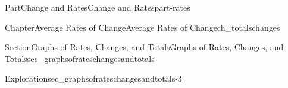 \documentclass[oneside,10pt,]{tufte-book}
\numberwithin{equation}{chapter}
\def \tikzhistogram (#1,#2){\draw[fill=blue,opacity=0.3] ({#1+((\xtwo-\xmin)/5)},#2) rectangle ({#1-((\xtwo-\xmin)/5)},0); \draw[draw,thick] ({#1+((\xtwo-\xmin)/5)},#2) rectangle ({#1-((\xtwo-\xmin)/5)},0); \node[draw,fill=blue, circle,inner sep=2.5pt] at (#1,#2) {};}
\begin{document}
\begin{partptx}{Part}{Change and Rates}{}{Change and Rates}{}{}{part-rates}
\begin{chapterptx}{Chapter}{Average Rates of Change}{}{Average Rates of Change}{}{}{ch_totalschanges}
\begin{sectionptx}{Section}{Graphs of Rates, Changes, and Totals}{}{Graphs of Rates, Changes, and Totals}{}{}{sec_graphsofrateschangesandtotals}
\begin{exploration}{Exploration}{}{sec_graphsofrateschangesandtotals-3}
\begin{enumerate}[font=\bfseries,label=(\alph*),ref=\alph*]
\begin{image}{0.275}{0.45}{0.275}{}
{%
\def \tikzhistogram (#1,#2){\draw[fill=blue,opacity=0.3] ({#1+((\xtwo-\xmin)/5)},#2) rectangle ({#1-((\xtwo-\xmin)/5)},0); \draw[draw,thick] ({#1+((\xtwo-\xmin)/5)},#2) rectangle ({#1-((\xtwo-\xmin)/5)},0); \node[draw,fill=blue, circle,inner sep=2.5pt] at (#1,#2) {};}
\def \xmin {0}
\def \xmax {22}
\def \xtwo {5}
\def \xunits { } 
\def \yunits { }
\def \dyunits { }
\def \yscale {2}
\def \xscale {.2*0.75}
\def \ymin {0}								%
\def \ysecondmajoraxis {1}		%
\def \yfirstminoraxis  {0.5}	%
\def \ysecondminoraxis {1.5}	%
\def \ymax {4}
\def \dymin {-2}
\def \dysecondmajoraxis {-1}
\def \dyfirstminoraxis  {-1.5}
\def \dysecondminoraxis {-0.5}
\def \dymax {2}

}
\end{image}
\end{enumerate}
\end{exploration}
\end{sectionptx}
\end{chapterptx}
\end{partptx}
\end{document}
